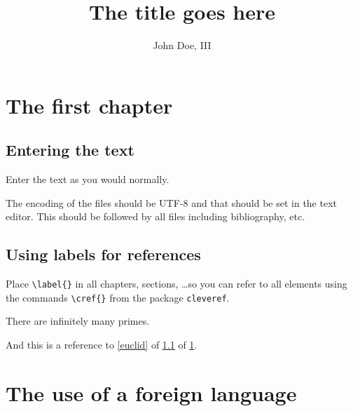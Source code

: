 \documentclass{book}
\begin{document}
\title{The title goes here}
\author{John Doe, III}
\maketitle

\frontmatter

\tableofcontents

\mainmatter


\chapter{The first chapter}
  \label{chap1}
  \section{Entering the text}
    \label{sec1.1}

Enter the text as you would normally.

The encoding of the files should be UTF-8 and that should be set in the text editor.
This should be followed by all files including bibliography, etc.

  \section{Using labels for references}

Place \verb+\label{}+ in all chapters, sections, \dots so you can refer to all elements
using the commands \verb+\cref{}+ from the package \texttt{cleveref}.

\begin{theorem}[Euclid, c. 300 BC] 
	\label{euclid}
	There are infinitely many primes.
\end{theorem} 

And this is a reference to \cref{euclid} of \cref{sec1.1} of \cref{chap1}.

    \subsection{}

      \paragraph{}

\chapter{The use of a foreign language}
\end{document}

